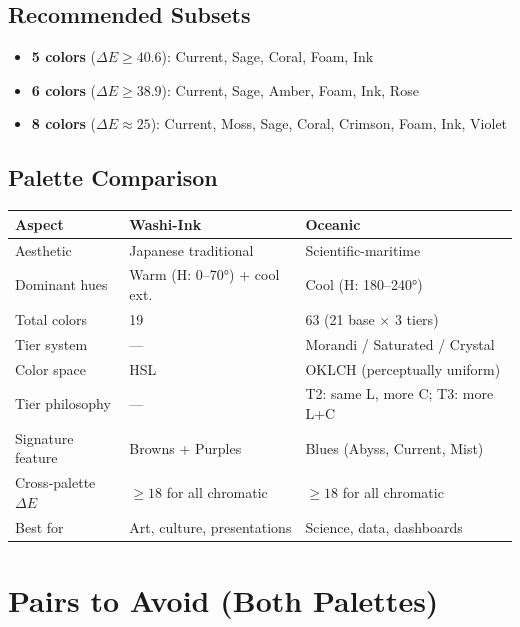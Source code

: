 \subsection*{Recommended Subsets}

\begin{itemize}
    \item \textbf{5 colors} ($\Delta E \geq 40.6$): Current, Sage, Coral, Foam, Ink
    \item \textbf{6 colors} ($\Delta E \geq 38.9$): Current, Sage, Amber, Foam, Ink, Rose
    \item \textbf{8 colors} ($\Delta E \approx 25$): Current, Moss, Sage, Coral, Crimson, Foam, Ink, Violet
\end{itemize}

\subsection*{Palette Comparison}

\begin{tabular}{lll}
    \toprule
    \textbf{Aspect} & \textbf{Washi-Ink} & \textbf{Oceanic} \\
    \midrule
    Aesthetic & Japanese traditional & Scientific-maritime \\
    Dominant hues & Warm (H: 0--70°) + cool ext. & Cool (H: 180--240°) \\
    Total colors & 19 & 63 (21 base × 3 tiers) \\
    Tier system & --- & Morandi / Saturated / Crystal \\
    Color space & HSL & OKLCH (perceptually uniform) \\
    Tier philosophy & --- & T2: same L, more C; T3: more L+C \\
    Signature feature & Browns + Purples & Blues (Abyss, Current, Mist) \\
    Cross-palette $\Delta E$ & $\geq 18$ for all chromatic & $\geq 18$ for all chromatic \\
    Best for & Art, culture, presentations & Science, data, dashboards \\
    \bottomrule
\end{tabular}

\newpage
\section{Pairs to Avoid (Both Palettes)}

